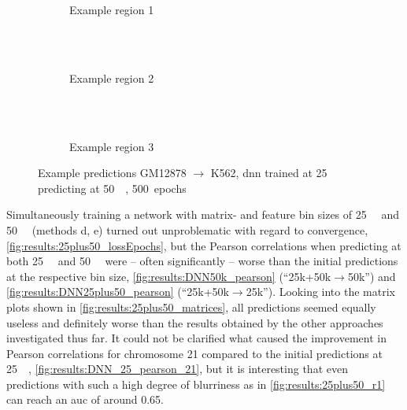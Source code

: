 \begin{figure}[p] %
    \begin{subfigure}{\textwidth}
        \centering
        \caption{Example  region 1} \label{fig:results:50k_from25k_r1}
    \end{subfigure}\\[2mm]
    \\[3mm]
    \begin{subfigure}{\textwidth}
        \centering
        \caption{Example region 2} \label{fig:results:50k_from25k_r2}
    \end{subfigure}\\[2mm]
    \\[3mm]
    \begin{subfigure}{\textwidth}
        \centering
        \caption{Example region 3} \label{fig:results:50k_from25k_r3}
    \end{subfigure}
    \caption{Example predictions GM12878 $\rightarrow$ K562,  \acrshort{dnn} trained at \SI{25}{\kilo\bp} predicting at \SI{50}{\kilo\bp}, 500~epochs} \label{fig:results:50k_from25k_matrices}
\end{figure}

Simultaneously training a network with matrix- and feature bin sizes of \SI{25}{\kilo\bp} and \SI{50}{\kilo\bp} (methods d, e)
turned out unproblematic with regard to convergence, \cref{fig:results:25plus50_lossEpochs}, 
but the Pearson correlations when predicting at both \SI{25}{\kilo\bp} and \SI{50}{\kilo\bp} were -- often significantly -- worse
than the initial predictions at the respective bin size, \cref{fig:results:DNN50k_pearson} (``25k+50k$\rightarrow$50k'') and \cref{fig:results:DNN25plus50_pearson} (``25k+50k$\rightarrow$25k'').
Looking into the matrix plots shown in \cref{fig:results:25plus50_matrices}, 
all predictions seemed equally useless and definitely worse than the results obtained by the other approaches investigated thus far.
It could not be clarified what caused the improvement in Pearson correlations for chromosome 21 compared to the initial predictions at \SI{25}{\kilo\bp}, 
\cref{fig:results:DNN_25_pearson_21}, but it is interesting that even predictions with such a high degree of blurriness as in \cref{fig:results:25plus50_r1}
can reach an \acrshort{auc} of around 0.65.

